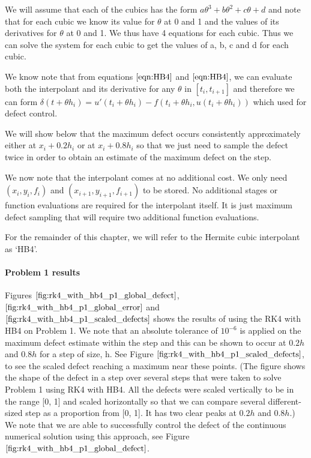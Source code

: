 \documentclass{article}
\begin{document}
We will assume that each of the cubics has the form $a\theta^3 + b\theta^2 + c\theta + d$ and note that for each cubic we know its value for $\theta$ at 0 and 1 and the values of its derivatives for $\theta$ at 0 and 1. We thus have 4 equations for each cubic. Thus we can solve the system for each cubic to get the values of a, b, c and d for each cubic.

We know note that from equations $\ref{eqn:HB4}$ and $\ref{eqn:HB4}$, we can evaluate both the interpolant and its derivative for any $\theta$ in $[t_i, t_{i + 1}]$ and therefore we can form $\delta(t + \theta h_i) = u'(t_i + \theta h_i) - f(t_i + \theta h_i, u(t_i + \theta h_i))$ which used for defect control.

We will show below that the maximum defect occurs consistently approximately either at $x_i + 0.2h_i$ or at $x_i + 0.8h_i$ so that we just need to sample the defect twice in order to obtain an estimate of the maximum defect on the step.

We now note that the interpolant comes at no additional cost. We only need $(x_i, y_i, f_i)$ and $(x_{i + 1}, y_{i + 1}, f_{i + 1})$ to be stored. No additional stages or function evaluations are required for the interpolant itself. It is just maximum defect sampling that will require two additional function evaluations.

For the remainder of this chapter, we will refer to the Hermite cubic interpolant as `HB4'.

\paragraph{Problem 1 results}
Figures $\ref{fig:rk4_with_hb4_p1_global_defect}$, $\ref{fig:rk4_with_hb4_p1_global_error}$ and $\ref{fig:rk4_with_hb4_p1_scaled_defects}$ shows the results of using the RK4 with HB4 on Problem 1. We note that an absolute tolerance of $10^{-6}$ is applied on the maximum defect estimate within the step and this can be shown to occur at $0.2h$ and $0.8h$ for a step of size, h. See Figure $\ref{fig:rk4_with_hb4_p1_scaled_defects}$, to see the scaled defect reaching a maximum near these points. (The figure shows the shape of the defect in a step over several steps that were taken to solve Problem 1 using RK4 with HB4. All the defects were scaled vertically to be in the range [0, 1] and scaled horizontally so that we can compare several different-sized step as a proportion from [0, 1]. It has two clear peaks at $0.2h$ and $0.8h$.) We note that we are able to successfully control the defect of the continuous numerical solution using this approach, see Figure $\ref{fig:rk4_with_hb4_p1_global_defect}$.
\end{document}
